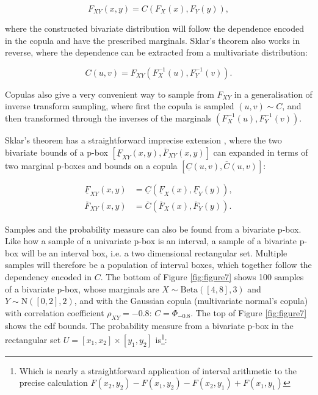 \documentclass{juliacon}
\begin{document}
\begin{equation*}
  F_{XY}(x,y) = C(F_{X}(x), F_{Y}(y)) ,
\end{equation*}

where the constructed bivariate distribution will follow the dependence encoded in the copula and have the prescribed marginals. Sklar's theorem also works in reverse, where the dependence can be extracted from a multivariate distribution: 

\begin{equation*}
  C(u,v) = F_{XY}(F^{-1}_{X}(u), F^{-1}_{Y}(v)) .
\end{equation*}

Copulas also give a very convenient way to sample from $F_{XY}$ in a generalisation of inverse transform sampling, where first the copula is sampled $(u,v) \sim C$, and then transformed through the inverses of the marginals $(F^{-1}_{X}(u), F^{-1}_{Y}(v))$.

Sklar's theorem has a straightforward imprecise extension \cite{montes2015sklar}, where the two bivariate bounds of a p-box $[\underline{F}_{XY}(x,y), \overline{F}_{XY}(x,y)]$ can expanded in terms of two marginal p-boxes and bounds on a copula $[\underline{C}(u,v), \overline{C}(u,v)]$: 

\begin{align*}
  \underline{F}_{XY}(x,y) &= \underline{C}(\underline{F}_{X}(x), \underline{F}_{Y}(y)), \\ 
  \overline{F}_{XY}(x,y) &= \overline{C}(\overline{F}_{X}(x), \overline{F}_{Y}(y)).
\end{align*}

Samples and the probability measure can also be found from a bivariate p-box. Like how a sample of a univariate p-box is an interval, a sample of a bivariate p-box will be an interval box, i.e. a two dimensional rectangular set. Multiple samples will therefore be a population of interval boxes, which together follow the dependency encoded in $C$. The bottom of Figure \ref{fig:figure7} shows 100 samples of a bivariate p-box, whose marginals are $X \sim \text{Beta}([4,8], 3)$ and $Y \sim \text{N}([0,2], 2)$, and with the Gaussian copula (multivariate normal's copula) with correlation coefficient $\rho_{XY} = -0.8$: $C = \Phi_{-0.8}$. The top of Figure \ref{fig:figure7} shows the cdf bounds. The probability measure from a bivariate p-box in the rectangular set $ U = [x_{1}, x_{2}] \times [y_{1}, y_{2}]$ is\footnote{Which is nearly a straightforward application of interval arithmetic to the precise calculation $F(x_{2}, y_{2}) - F(x_{1}, y_{2}) - F(x_{2}, y_{1}) + F(x_{1}, y_{1})$}: 
\end{document}
